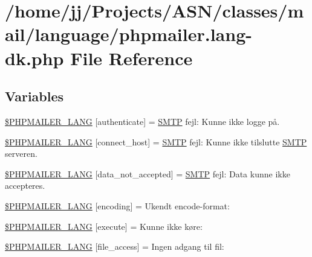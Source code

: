\hypertarget{phpmailer_8lang-dk_8php}{}\section{/home/jj/\+Projects/\+A\+S\+N/classes/mail/language/phpmailer.lang-\/dk.php File Reference}
\label{phpmailer_8lang-dk_8php}
\subsection*{Variables}
\begin{DoxyCompactItemize}
\item 
\hyperlink{phpmailer_8lang-dk_8php_a2cb33073c989b85580748e331ed8b4aa}{\$\+P\+H\+P\+M\+A\+I\+L\+E\+R\+\_\+\+L\+A\+NG} \mbox{[}\textquotesingle{}authenticate\textquotesingle{}\mbox{]} = \textquotesingle{}\hyperlink{class_s_m_t_p}{S\+M\+TP} fejl\+: Kunne ikke logge på.\textquotesingle{}
\item 
\hyperlink{phpmailer_8lang-dk_8php_a2ee0cc637a06b96e45600db31c6799ee}{\$\+P\+H\+P\+M\+A\+I\+L\+E\+R\+\_\+\+L\+A\+NG} \mbox{[}\textquotesingle{}connect\+\_\+host\textquotesingle{}\mbox{]} = \textquotesingle{}\hyperlink{class_s_m_t_p}{S\+M\+TP} fejl\+: Kunne ikke tilslutte \hyperlink{class_s_m_t_p}{S\+M\+TP} serveren.\textquotesingle{}
\item 
\hyperlink{phpmailer_8lang-dk_8php_a814c6b191205d2361b3233e9c9d6fda5}{\$\+P\+H\+P\+M\+A\+I\+L\+E\+R\+\_\+\+L\+A\+NG} \mbox{[}\textquotesingle{}data\+\_\+not\+\_\+accepted\textquotesingle{}\mbox{]} = \textquotesingle{}\hyperlink{class_s_m_t_p}{S\+M\+TP} fejl\+: Data kunne ikke accepteres.\textquotesingle{}
\item 
\hyperlink{phpmailer_8lang-dk_8php_a817f7283f3d54c970a0c10305cc668cc}{\$\+P\+H\+P\+M\+A\+I\+L\+E\+R\+\_\+\+L\+A\+NG} \mbox{[}\textquotesingle{}encoding\textquotesingle{}\mbox{]} = \textquotesingle{}Ukendt encode-\/format\+: \textquotesingle{}
\item 
\hyperlink{phpmailer_8lang-dk_8php_a668217a9563a168f30f2a8548b6ed5a9}{\$\+P\+H\+P\+M\+A\+I\+L\+E\+R\+\_\+\+L\+A\+NG} \mbox{[}\textquotesingle{}execute\textquotesingle{}\mbox{]} = \textquotesingle{}Kunne ikke køre\+: \textquotesingle{}
\item 
\hyperlink{phpmailer_8lang-dk_8php_a7e83349023b856ef9e5c46e30ae6d51e}{\$\+P\+H\+P\+M\+A\+I\+L\+E\+R\+\_\+\+L\+A\+NG} \mbox{[}\textquotesingle{}file\+\_\+access\textquotesingle{}\mbox{]} = \textquotesingle{}Ingen adgang til fil\+: \textquotesingle{}

\end{DoxyCompactItemize}
